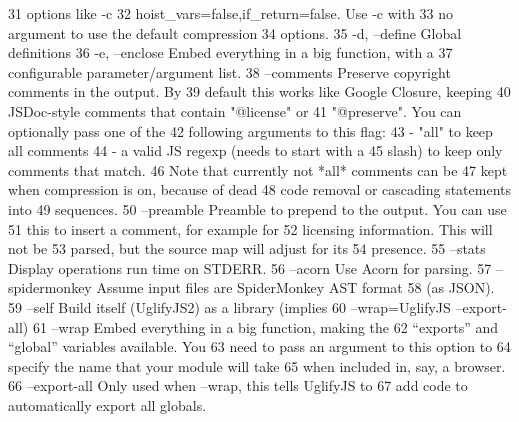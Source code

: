 \begin{DoxyCode}
31                               options like -c
32                               hoist\_vars=false,if\_return=false. Use -c with
33                               no argument to use the default compression
34                               options.
35 -d, --define                  Global definitions
36 -e, --enclose                 Embed everything in a big function, with a
37                               configurable parameter/argument list.
38 --comments                    Preserve copyright comments in the output. By
39                               default this works like Google Closure, keeping
40                               JSDoc-style comments that contain "@license" or
41                               "@preserve". You can optionally pass one of the
42                               following arguments to this flag:
43                               - "all" to keep all comments
44                               - a valid JS regexp (needs to start with a
45                               slash) to keep only comments that match.
46                               Note that currently not *all* comments can be
47                               kept when compression is on, because of dead
48                               code removal or cascading statements into
49                               sequences.
50 --preamble                    Preamble to prepend to the output.  You can use
51                               this to insert a comment, for example for
52                               licensing information.  This will not be
53                               parsed, but the source map will adjust for its
54                               presence.
55 --stats                       Display operations run time on STDERR.
56 --acorn                       Use Acorn for parsing.
57 --spidermonkey                Assume input files are SpiderMonkey AST format
58                               (as JSON).
59 --self                        Build itself (UglifyJS2) as a library (implies
60                               --wrap=UglifyJS --export-all)
61 --wrap                        Embed everything in a big function, making the
62                               “exports” and “global” variables available. You
63                               need to pass an argument to this option to
64                               specify the name that your module will take
65                               when included in, say, a browser.
66 --export-all                  Only used when --wrap, this tells UglifyJS to
67                               add code to automatically export all globals.

\end{DoxyCode}
